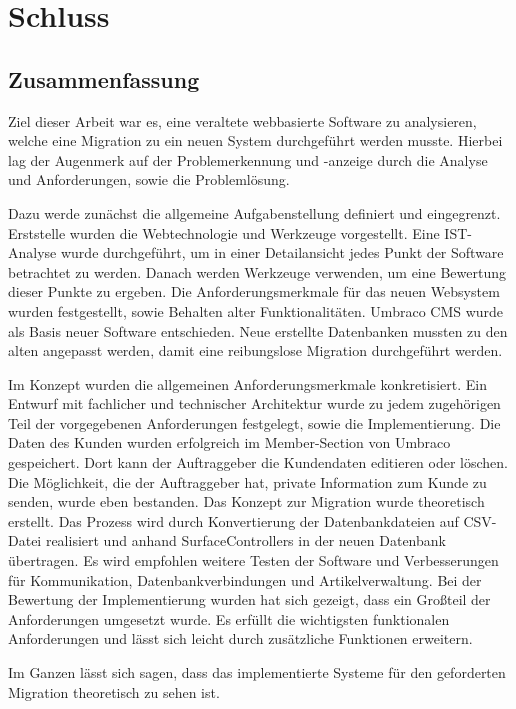 \chapter{Schluss}
\section{Zusammenfassung}

Ziel dieser Arbeit war es, eine veraltete webbasierte Software zu analysieren, welche eine Migration zu ein neuen System durchgeführt werden musste. Hierbei lag der Augenmerk auf der Problemerkennung und -anzeige durch die Analyse und Anforderungen, sowie die Problemlösung.

Dazu werde zunächst die allgemeine Aufgabenstellung definiert und eingegrenzt. Erststelle wurden die Webtechnologie und Werkzeuge vorgestellt. 
Eine IST-Analyse wurde durchgeführt, um in einer Detailansicht jedes Punkt der Software betrachtet zu werden. Danach werden Werkzeuge verwenden, um eine Bewertung dieser Punkte zu ergeben.
Die Anforderungsmerkmale für das neuen Websystem wurden festgestellt, sowie Behalten alter Funktionalitäten. Umbraco CMS wurde als Basis neuer Software entschieden. Neue erstellte Datenbanken mussten zu den alten angepasst werden, damit eine reibungslose Migration durchgeführt werden.

Im Konzept wurden die allgemeinen Anforderungsmerkmale konkretisiert.
Ein Entwurf mit fachlicher und technischer Architektur wurde zu jedem zugehörigen Teil der vorgegebenen Anforderungen festgelegt, sowie die Implementierung. 
Die Daten des Kunden wurden erfolgreich im Member-Section von Umbraco gespeichert. Dort kann der Auftraggeber die Kundendaten editieren oder löschen. Die Möglichkeit, die der Auftraggeber hat, private Information zum Kunde zu senden, wurde eben bestanden.
Das Konzept zur Migration wurde theoretisch erstellt. Das Prozess wird durch Konvertierung der Datenbankdateien auf CSV-Datei realisiert und anhand SurfaceControllers in der neuen Datenbank übertragen. Es wird empfohlen weitere Testen der Software und Verbesserungen für Kommunikation, Datenbankverbindungen und Artikelverwaltung.  
Bei der Bewertung der Implementierung wurden hat sich gezeigt, dass ein Großteil der Anforderungen umgesetzt wurde. Es erfüllt die wichtigsten funktionalen Anforderungen und lässt sich leicht durch zusätzliche Funktionen erweitern.

Im Ganzen lässt sich sagen, dass das implementierte Systeme für den geforderten Migration theoretisch zu sehen ist.

